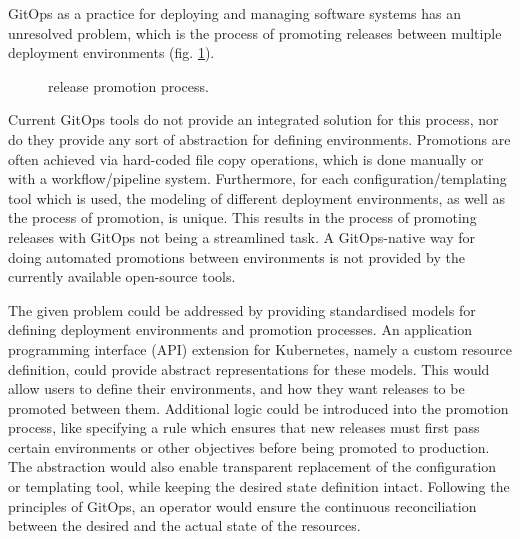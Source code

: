 GitOps as a practice for deploying and managing software systems has an unresolved problem, which is
the process of promoting releases between multiple deployment environments (fig. \ref{fig:releasePromotionProcess}).

\begin{figure}[h]
	\centering
	\caption{release promotion process.
	}
	\label{fig:releasePromotionProcess}	
\end{figure}

Current GitOps tools do not provide an integrated solution for this process,
nor do they provide any sort of abstraction for defining environments.
Promotions are often achieved via hard-coded file copy operations,
which is done manually or with a workflow/pipeline system.
Furthermore, for each configuration/templating tool which is used,
the modeling of different deployment environments, as well as the
process of promotion, is unique.
This results in the process of promoting releases with GitOps
not being a streamlined task.
A GitOps-native way for doing automated promotions between environments is
not provided by the currently available open-source tools.


%
The given problem could be addressed by
providing standardised models 
for defining deployment environments and promotion processes.
%
An application programming interface (API) extension for Kubernetes,
namely a custom resource definition,
could provide abstract representations for these models.
%
This would allow users to define
their environments,
and how they want releases to be promoted between them.
%
Additional logic could be introduced into the promotion process,
like specifying a rule which ensures that new releases must first pass
certain environments or other objectives before being promoted to production.
%
The abstraction would also enable transparent replacement of the
configuration or templating tool,
while keeping the desired state definition intact.
%
Following the principles of GitOps,
an operator would ensure the continuous reconciliation
between the desired and the actual state of the resources.

